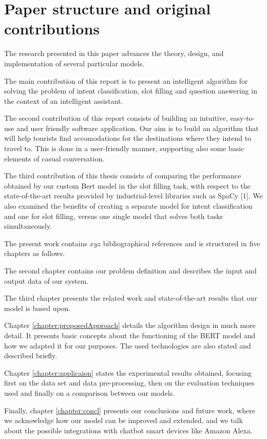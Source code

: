 \documentclass[runningheads,a4paper,11pt]{report}
\begin{document}
\section{Paper structure and original contributions}
\label{section:structure}

    The research presented in this paper advances the theory, design, and implementation of several particular models. 

The main contribution of this report is to present an intelligent algorithm for solving the problem of intent classification, slot filling and question answering in the context of an intelligent assistant.

The second contribution of this report consists of building an intuitive, easy-to-use and user
friendly software application. Our aim is to build an algorithm that will help tourists find accomodations for the destinations where they intend to travel to. 
This is done in a user-friendly manner, supporting also some basic elements of casual conversation.

The third contribution of this thesis consists of comparing the performance obtained by our custom Bert model in the slot filling task, with respect to the state-of-the-art results provided by industrial-level libraries such as SpaCy [1].
We also examined the benefits of creating a separate model for intent classification and one for slot filling, versus one single model that solves both tasks simultaneously.


The present work contains $xyz$ bibliographical references and is structured in five chapters as follows.

The second chapter contains our problem definition and describes the input and output data of our system.

The third chapter presents the related work and state-of-the-art results that our model is based upon.

Chapter \ref{chapter:proposedApproach} details the algorithm design in much more detail. It presents basic concepts about the functioning of the BERT model and how we adapted it for our purposes. The used technologies are also stated and described briefly.

Chapter \ref{chapter:applicaion} states the experimental results obtained, focusing first on the data set and data pre-processing, then on the evaluation techniques used and finally on a comparison between our models.

Finally, chapter \ref{chapter:concl} presents our conclusions and future work, where we acknowledge how our model can be improved and extended, and we talk about the possible integrations with chatbot smart devices like Amazon Alexa.
\end{document}
